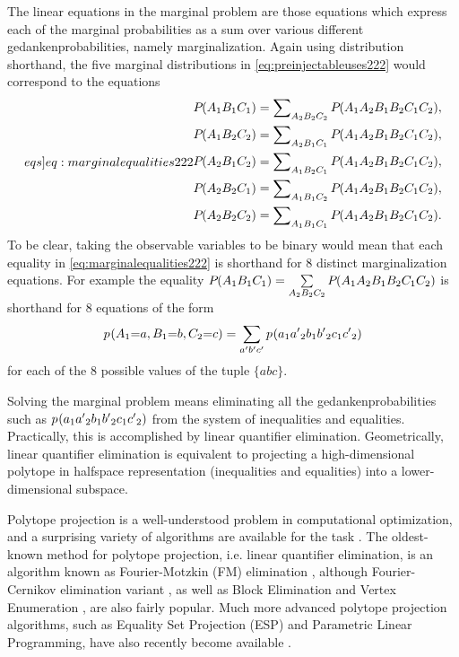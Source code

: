 The linear equations in the marginal problem are those equations which express each of the marginal probabilities as a sum over various different gedankenprobabilities, namely marginalization. Again using distribution shorthand, the five marginal distributions in \cref{eq:preinjectableuses222} would correspond to the equations
\begin{align}\label[eqs]{eq:marginalequalities222}
\begin{split}
&\pdf{A_1 B_1 C_1} = \sum\nolimits_{A_2 B_2 C_2}\pdf{A_1 A_2 B_1 B_2 C_1 C_2},\\
&\pdf{A_1 B_2 C_2} = \sum\nolimits_{A_2 B_1 C_1}\pdf{A_1 A_2 B_1 B_2 C_1 C_2},\\
&\pdf{A_2 B_1 C_2} = \sum\nolimits_{A_1 B_2 C_1}\pdf{A_1 A_2 B_1 B_2 C_1 C_2},\\
&\pdf{A_2 B_2 C_1} = \sum\nolimits_{A_1 B_1 C_2}\pdf{A_1 A_2 B_1 B_2 C_1 C_2},\\
&\pdf{A_2 B_2 C_2} = \sum\nolimits_{A_1 B_1 C_1}\pdf{A_1 A_2 B_1 B_2 C_1 C_2}.
\end{split}
\end{align}
To be clear, taking the observable variables to be binary would mean that each equality in \cref{eq:marginalequalities222} is shorthand for 8 distinct marginalization equations. For example the equality ${P_{}}\lparen A_1 B_1 C_1\rparen = \sum\limits_{A_2 B_2 C_2}{P_{}}\lparen A_1 A_2 B_1 B_2 C_1 C_2\rparen$ is shorthand for 8 equations of the form
\begin{align}
{p_{}}\lparen A_1\mathord{=} a,  B_1\mathord{=} b, C_2\mathord{=} c\rparen = \sum\limits_{a' b' c'}{p_{}}\lparen a_1 {a'}_2 {b}_1 {b'}_2 {c}_1 {c'}_2\rparen
\end{align}
for each of the 8 possible values of the tuple $\{a b c\}$.

Solving the marginal problem means eliminating all the gedankenprobabilities such as ${p_{}}\lparen a_1 {a'}_2 {b}_1 {b'}_2 {c}_1 {c'}_2\rparen$ from the system of inequalities and equalities. Practically, this is accomplished by linear quantifier elimination. 
Geometrically, linear quantifier elimination is equivalent to projecting a high-dimensional polytope in halfspace representation (inequalities and equalities) into a lower-dimensional subspace.

Polytope projection is a well-understood problem in computational optimization, and a surprising variety of algorithms are available for the task \cite{jones2004equality,JonesThesis2005,Jones2008}. The oldest-known method for polytope projection, i.e. linear quantifier elimination, is an algorithm known as Fourier-Motzkin (FM) elimination \cite{fordan1999projection,DantzigEaves}, although Fourier-Cernikov elimination variant \cite{Shapot2012,Bastrakov2015}, as well as Block Elimination and Vertex Enumeration \cite{Avis2000lrs}, are also fairly popular. Much more advanced polytope projection algorithms, such as Equality Set Projection (ESP) and Parametric Linear Programming, have also recently become available \cite{jones2004equality,JonesThesis2005,Jones2008}. 

